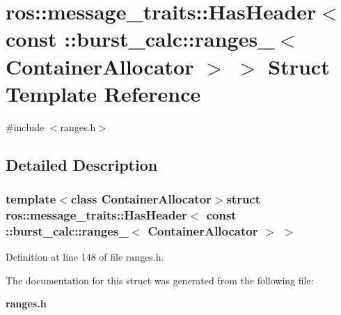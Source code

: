 \section{ros\-:\-:message\-\_\-traits\-:\-:\-Has\-Header$<$ const \-:\-:burst\-\_\-calc\-:\-:ranges\-\_\-$<$ \-Container\-Allocator $>$ $>$ \-Struct \-Template \-Reference}
\label{structros_1_1message__traits_1_1HasHeader_3_01const_01_1_1burst__calc_1_1ranges___3_01ContainerAllocator_01_4_01_4}


{\ttfamily \#include $<$ranges.\-h$>$}



\subsection{\-Detailed \-Description}
\subsubsection*{template$<$class Container\-Allocator$>$struct ros\-::message\-\_\-traits\-::\-Has\-Header$<$ const \-::burst\-\_\-calc\-::ranges\-\_\-$<$ Container\-Allocator $>$ $>$}



\-Definition at line 148 of file ranges.\-h.



\-The documentation for this struct was generated from the following file\-:\begin{DoxyCompactItemize}
\item 
{\bf ranges.\-h}\end{DoxyCompactItemize}
